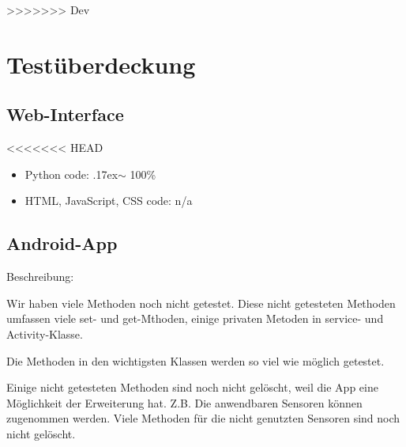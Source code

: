\documentclass[a4paper]{scrreprt}
\begin{document}
>>>>>>> Dev
			
			
		\newpage
		\chapter{Test\"uberdeckung}
			\section{Web-Interface}
<<<<<<< HEAD
			     \begin{itemize}
                     \item Python code: {\raise.17ex\hbox{$\scriptstyle\sim$}} 100\%
                     \item HTML, JavaScript, CSS code: n/a
                 \end{itemize}
			
			\section{Android-App}
                 Beschreibung:
                 \par Wir haben viele Methoden noch nicht getestet. Diese nicht getesteten Methoden umfassen viele set- und get-Mthoden, einige privaten Metoden in service- und Activity-Klasse.
                 \par Die Methoden in den wichtigsten Klassen werden so viel wie m\"oglich getestet.
                 \par Einige nicht getesteten Methoden sind noch nicht gelöscht, weil die App eine M\"oglichkeit der Erweiterung hat. Z.B. Die anwendbaren Sensoren können zugenommen werden. Viele Methoden f\"ur die nicht genutzten Sensoren sind noch nicht gelöscht.
\end{document}
